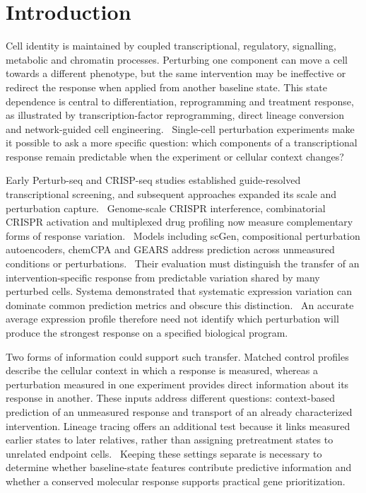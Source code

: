 \documentclass[a4paper,fleqn]{cas-sc}
\makeatletter
\DeclareRobustCommand{\rev}[1]{{\color{red}\def\@citecolor{black}\def\@linkcolor{red}\def\@urlcolor{red}#1}}
\let\unmarkedcite\cite
\renewcommand{\cite}[1]{{\color{black}\def\@citecolor{black}\unmarkedcite{#1}}}
\makeatother
\begin{document}
\section{Introduction}

Cell identity is maintained by coupled transcriptional, regulatory, signalling, metabolic and chromatin processes. Perturbing one component can move a cell towards a different phenotype, but the same intervention may be ineffective or redirect the response when applied from another baseline state. This state dependence is central to differentiation, reprogramming and treatment response, as illustrated by transcription-factor reprogramming, direct lineage conversion and network-guided cell engineering.~\cite{takahashi2006,cahan2014,rackham2016,kamimoto2023} \rev{Single-cell perturbation experiments make it possible to ask a more specific question: which components of a transcriptional response remain predictable when the experiment or cellular context changes?}

\rev{Early Perturb-seq and CRISP-seq studies established guide-resolved transcriptional screening, and subsequent approaches expanded its scale and perturbation capture.~\cite{dix2016,adamson2016,jaitin2016,datlinger2017,gasperini2019,schraivogel2020}} \rev{Genome-scale CRISPR interference, combinatorial CRISPR activation and multiplexed drug profiling now measure complementary forms of response variation.~\cite{replogle2022,norman2019,mcfarland2020}} \rev{Models including scGen, compositional perturbation autoencoders, chemCPA and GEARS address prediction across unmeasured conditions or perturbations.~\cite{scgen2019,cpa2023,chemcpa2022,gears2024}} \rev{Their evaluation must distinguish the transfer of an intervention-specific response from predictable variation shared by many perturbed cells.} \rev{Systema demonstrated that systematic expression variation can dominate common prediction metrics and obscure this distinction.~\cite{systema2026}} \rev{An accurate average expression profile therefore need not identify which perturbation will produce the strongest response on a specified biological program.}

\rev{Two forms of information could support such transfer.} \rev{Matched control profiles describe the cellular context in which a response is measured, whereas a perturbation measured in one experiment provides direct information about its response in another.} \rev{These inputs address different questions: context-based prediction of an unmeasured response and transport of an already characterized intervention.} \rev{Lineage tracing offers an additional test because it links measured earlier states to later relatives, rather than assigning pretreatment states to unrelated endpoint cells.~\cite{weinreb2020,biddy2018,kester2018,schaff2024}} \rev{Keeping these settings separate is necessary to determine whether baseline-state features contribute predictive information and whether a conserved molecular response supports practical gene prioritization.}
\end{document}
